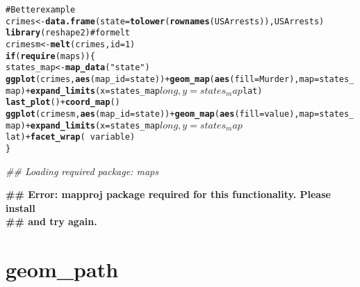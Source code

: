 \documentclass[a4paper,titlepage]{tufte-handout}\usepackage{graphicx, color}
\makeatletter
\newcommand{\hlfunctioncall}[1]{\textcolor[rgb]{0.501960784313725,0,0.329411764705882}{\textbf{#1}}}%
\newcommand{\hlstring}[1]{\textcolor[rgb]{0.6,0.6,1}{#1}}%
\newcommand{\hlcomment}[1]{\textcolor[rgb]{0.180392156862745,0.6,0.341176470588235}{#1}}%
\newenvironment{kframe}{%
 \def\at@end@of@kframe{}%
 \ifinner\ifhmode%
  \def\at@end@of@kframe{\end{minipage}}%
  \begin{minipage}{\columnwidth}%
 \fi\fi%
 \def\FrameCommand##1{\hskip\@totalleftmargin \hskip-\fboxsep
 \colorbox{shadecolor}{##1}\hskip-\fboxsep
     \hskip-\linewidth \hskip-\@totalleftmargin \hskip\columnwidth}%
 \MakeFramed {\advance\hsize-\width
   \@totalleftmargin\z@ \linewidth\hsize
   \@setminipage}}%
 {\par\unskip\endMakeFramed%
 \at@end@of@kframe}
\newenvironment{knitrout}{}{} %
\makeatother
\begin{document}
\begin{knitrout}
\begin{kframe}
\begin{alltt}
\hlcomment{# Better example}
crimes <- \hlfunctioncall{data.frame}(state = \hlfunctioncall{tolower}(\hlfunctioncall{rownames}(USArrests)), USArrests)
\hlfunctioncall{library}(reshape2) \hlcomment{# for melt}
crimesm <- \hlfunctioncall{melt}(crimes, id = 1)
\hlfunctioncall{if} (\hlfunctioncall{require}(maps)) \{
  states_map <- \hlfunctioncall{map_data}(\hlstring{"state"})
  \hlfunctioncall{ggplot}(crimes, \hlfunctioncall{aes}(map_id = state)) + \hlfunctioncall{geom_map}(\hlfunctioncall{aes}(fill = Murder), map = states_map) + \hlfunctioncall{expand_limits}(x = states_map$long, y = states_map$lat)
  \hlfunctioncall{last_plot}() + \hlfunctioncall{coord_map}()
  \hlfunctioncall{ggplot}(crimesm, \hlfunctioncall{aes}(map_id = state)) + \hlfunctioncall{geom_map}(\hlfunctioncall{aes}(fill = value), map = states_map) + \hlfunctioncall{expand_limits}(x = states_map$long, y = states_map$lat) + \hlfunctioncall{facet_wrap}( ~ variable)
\}
\end{alltt}
\begin{flushleft}\ttfamily\noindent\itshape\textcolor{messagecolor}{\#\# Loading required package: maps}\end{flushleft}\begin{flushleft}\ttfamily\noindent\bfseries\textcolor{errorcolor}{\#\# Error: mapproj package required for this functionality.  Please install \\ 
\#\# and try again.}\end{flushleft}\end{kframe}
\end{knitrout}


\section{geom\_path}
\end{document}
